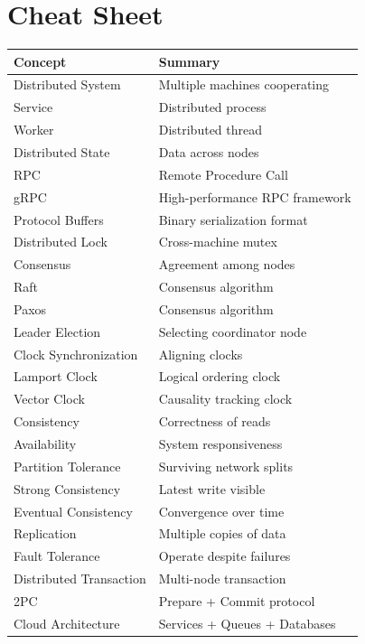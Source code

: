 \section{Cheat Sheet}

\begin{longtable}{|p{5cm}|p{8cm}|}
\hline
Concept & Summary \\
\hline
Distributed System & Multiple machines cooperating \\
\hline
Service & Distributed process \\
\hline
Worker & Distributed thread \\
\hline
Distributed State & Data across nodes \\
\hline
RPC & Remote Procedure Call \\
\hline
gRPC & High-performance RPC framework \\
\hline
Protocol Buffers & Binary serialization format \\
\hline
Distributed Lock & Cross-machine mutex \\
\hline
Consensus & Agreement among nodes \\
\hline
Raft & Consensus algorithm \\
\hline
Paxos & Consensus algorithm \\
\hline
Leader Election & Selecting coordinator node \\
\hline
Clock Synchronization & Aligning clocks \\
\hline
Lamport Clock & Logical ordering clock \\
\hline
Vector Clock & Causality tracking clock \\
\hline
Consistency & Correctness of reads \\
\hline
Availability & System responsiveness \\
\hline
Partition Tolerance & Surviving network splits \\
\hline
Strong Consistency & Latest write visible \\
\hline
Eventual Consistency & Convergence over time \\
\hline
Replication & Multiple copies of data \\
\hline
Fault Tolerance & Operate despite failures \\
\hline
Distributed Transaction & Multi-node transaction \\
\hline
2PC & Prepare + Commit protocol \\
\hline
Cloud Architecture & Services + Queues + Databases \\
\hline
\end{longtable}